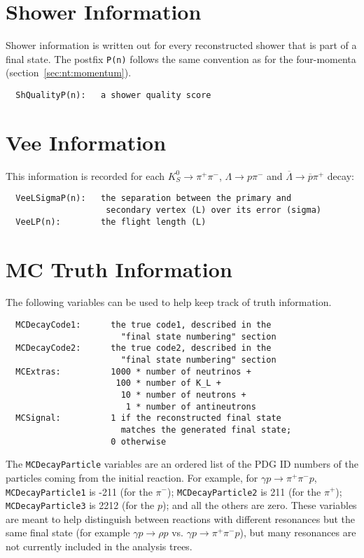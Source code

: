 \documentclass[11pt]{article}
\begin{document}
\section{Shower Information}
\label{sec:nt:shower}

Shower information is written out for every reconstructed shower that is part of a final state.  The postfix {\tt P(n)} follows the same convention as for the four-momenta (section~\ref{sec:nt:momentum}).
\begin{verbatim}
  ShQualityP(n):   a shower quality score
\end{verbatim}

\section{Vee Information}
\label{sec:nt:vee}

This information is recorded for each $K^0_S\to\pi^+\pi^-$, $\Lambda \to p\pi^-$ and $\overline{\Lambda}\to\overline{p}\pi^+$ decay:
\begin{verbatim}
  VeeLSigmaP(n):   the separation between the primary and
                    secondary vertex (L) over its error (sigma)
  VeeLP(n):        the flight length (L)
\end{verbatim}

\section{MC Truth Information}
\label{sec:nt:truth}

The following variables can be used to help keep track of truth information.

\begin{verbatim}
  MCDecayCode1:      the true code1, described in the
                       "final state numbering" section
  MCDecayCode2:      the true code2, described in the
                       "final state numbering" section
  MCExtras:          1000 * number of neutrinos +
                      100 * number of K_L +
                       10 * number of neutrons +
                        1 * number of antineutrons
  MCSignal:          1 if the reconstructed final state
                       matches the generated final state;
                     0 otherwise
\end{verbatim}

The {\tt MCDecayParticle} variables are an ordered list of the PDG ID numbers of the particles coming from the initial reaction.
For example, for $\gamma p \to \pi^+ \pi^- p$,
{\tt MCDecayParticle1} is -211 (for the $\pi^-$);
{\tt MCDecayParticle2} is 211 (for the $\pi^+$);
{\tt MCDecayParticle3} is 2212 (for the $p$);
and all the others are zero.
These variables are meant to help distinguish between reactions with different resonances but the same final state (for example $\gamma p \to \rho p$ vs. $\gamma p \to \pi^+ \pi^- p$), but many resonances are not currently included in the analysis trees.
\end{document}

